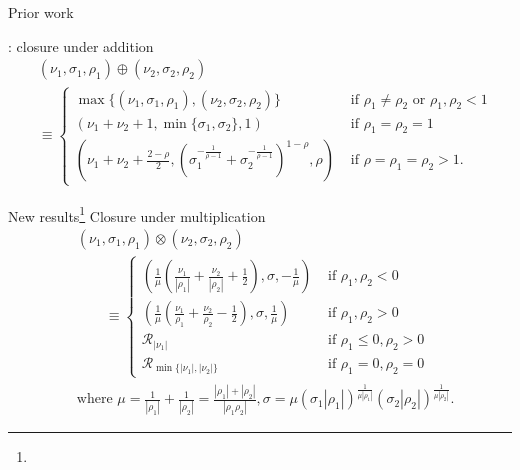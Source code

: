 \begin{frame}{Prior work}

    \parencite{resnick2007heavy}: closure under addition
    \begin{align*}
        &  (\nu_{1},\sigma_{1},\rho_{1})\oplus(\nu_{2},\sigma_{2},\rho_{2}) \\
        & \equiv \begin{cases}
            \max\{(\nu_{1},\sigma_{1},\rho_{1}),(\nu_{2},\sigma_{2},\rho_{2})\} & \text{ if }\rho_{1}\neq\rho_{2}\text{ or }\rho_{1},\rho_{2}<1\\
            \left(\nu_{1}+\nu_{2}+1,\min\{\sigma_{1},\sigma_{2}\},1\right) & \text{ if }\rho_{1}=\rho_{2}=1\\
            (\nu_{1}+\nu_{2}+\frac{2-\rho}{2},(\sigma_{1}^{-\frac{1}{\rho-1}}+\sigma_{2}^{-\frac{1}{\rho-1}})^{1-\rho},\rho) & \text{ if }\rho=\rho_{1}=\rho_{2}>1.
        \end{cases}
    \end{align*}
\end{frame}

\begin{frame}{New results\footnote{}}
    Closure under multiplication
    \begin{align*}
        & (\nu_{1},\sigma_{1},\rho_{1})\otimes(\nu_{2},\sigma_{2},\rho_{2}) \\
        &\qquad \equiv\begin{cases}
        \left(\frac{1}{\mu}\left(\frac{\nu_{1}}{|\rho_{1}|}+\frac{\nu_{2}}{|\rho_{2}|}+\frac{1}{2}\right),\sigma,-\frac{1}{\mu}\right) & \text{ if }\rho_{1},\rho_{2}<0\\
        \left(\frac{1}{\mu}\left(\frac{\nu_{1}}{\rho_{1}}+\frac{\nu_{2}}{\rho_{2}}-\frac{1}{2}\right),\sigma,\frac{1}{\mu}\right) & \text{ if }\rho_{1},\rho_{2}>0\\
        \mathcal{R}_{|\nu_1|} & \mbox{ if }\rho_{1}\leq0,\rho_{2}>0 \\
        \mathcal{R}_{\min\{|\nu_1|,|\nu_2|\}} & \mbox{ if }\rho_{1}=0,\rho_{2}=0
        \end{cases} \\
        &\text{where }\mu=\frac{1}{|\rho_{1}|}+\frac{1}{|\rho_{2}|}=\frac{|\rho_{1}|+|\rho_{2}|}{|\rho_{1}\rho_{2}|}, \sigma=\mu(\sigma_{1}|\rho_{1}|)^{\frac{1}{\mu|\rho_{1}|}}(\sigma_{2}|\rho_{2}|)^{\frac{1}{\mu|\rho_{2}|}}.
    \end{align*}
\end{frame}

